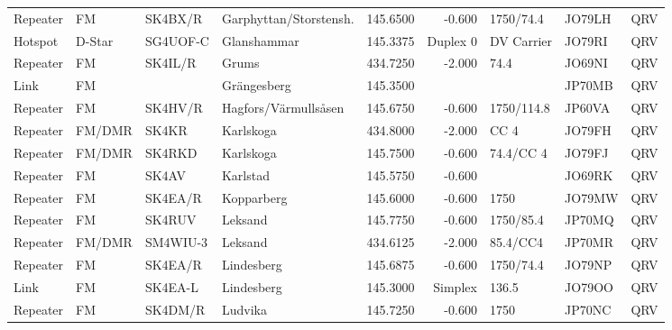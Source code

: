 \begin{landscape}
\begin{longtable}{llllrrlll}
	Repeater              & FM         & SK4BX/R  & Garphyttan/Storstensh. &     145.6500 &     -0.600 & 1750/74.4         & JO79LH      & QRV      \\
	Hotspot               & D-Star     & SG4UOF-C & Glanshammar            &     145.3375 &   Duplex 0 & DV Carrier        & JO79RI      & QRV      \\
	Repeater              & FM         & SK4IL/R  & Grums                  &     434.7250 &     -2.000 & 74.4              & JO69NI      & QRV      \\
	Link                  & FM         &          & Grängesberg            &     145.3500 &            &                   & JP70MB      & QRV      \\
	Repeater              & FM         & SK4HV/R  & Hagfors/Värmullsåsen   &     145.6750 &     -0.600 & 1750/114.8        & JP60VA      & QRV      \\
	Repeater              & FM/DMR     & SK4KR    & Karlskoga              &     434.8000 &     -2.000 & CC 4              & JO79FH      & QRV      \\
	Repeater              & FM/DMR     & SK4RKD   & Karlskoga              &     145.7500 &     -0.600 & 74.4/CC 4         & JO79FJ      & QRV      \\
	Repeater              & FM         & SK4AV    & Karlstad               &     145.5750 &     -0.600 &                   & JO69RK      & QRV      \\
	Repeater              & FM         & SK4EA/R  & Kopparberg             &     145.6000 &     -0.600 & 1750              & JO79MW      & QRV      \\
	Repeater              & FM         & SK4RUV   & Leksand                &     145.7750 &     -0.600 & 1750/85.4         & JP70MQ      & QRV      \\
	Repeater              & FM/DMR     & SM4WIU-3 & Leksand                &     434.6125 &     -2.000 & 85.4/CC4          & JP70MR      & QRV      \\
	Repeater              & FM         & SK4EA/R  & Lindesberg             &     145.6875 &     -0.600 & 1750/74.4         & JO79NP      & QRV      \\
	Link                  & FM         & SK4EA-L  & Lindesberg             &     145.3000 &    Simplex & 136.5             & JO79OO      & QRV      \\
	Repeater              & FM         & SK4DM/R  & Ludvika                &     145.7250 &     -0.600 & 1750              & JP70NC      & QRV      \\

\end{longtable}
\end{landscape}
